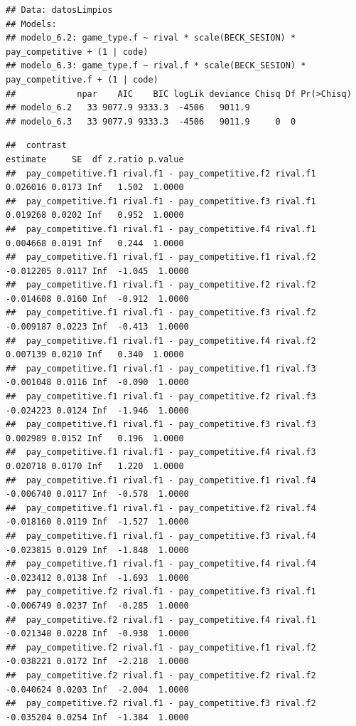 \documentclass[
]{article}
\begin{document}
\begin{verbatim}
## Data: datosLimpios
## Models:
## modelo_6.2: game_type.f ~ rival * scale(BECK_SESION) * pay_competitive + (1 | code)
## modelo_6.3: game_type.f ~ rival.f * scale(BECK_SESION) * pay_competitive.f + (1 | code)
##            npar    AIC    BIC logLik deviance Chisq Df Pr(>Chisq)
## modelo_6.2   33 9077.9 9333.3  -4506   9011.9                    
## modelo_6.3   33 9077.9 9333.3  -4506   9011.9     0  0
\end{verbatim}

\begin{verbatim}
##  contrast                                                   estimate     SE  df z.ratio p.value
##  pay_competitive.f1 rival.f1 - pay_competitive.f2 rival.f1  0.026016 0.0173 Inf   1.502  1.0000
##  pay_competitive.f1 rival.f1 - pay_competitive.f3 rival.f1  0.019268 0.0202 Inf   0.952  1.0000
##  pay_competitive.f1 rival.f1 - pay_competitive.f4 rival.f1  0.004668 0.0191 Inf   0.244  1.0000
##  pay_competitive.f1 rival.f1 - pay_competitive.f1 rival.f2 -0.012205 0.0117 Inf  -1.045  1.0000
##  pay_competitive.f1 rival.f1 - pay_competitive.f2 rival.f2 -0.014608 0.0160 Inf  -0.912  1.0000
##  pay_competitive.f1 rival.f1 - pay_competitive.f3 rival.f2 -0.009187 0.0223 Inf  -0.413  1.0000
##  pay_competitive.f1 rival.f1 - pay_competitive.f4 rival.f2  0.007139 0.0210 Inf   0.340  1.0000
##  pay_competitive.f1 rival.f1 - pay_competitive.f1 rival.f3 -0.001048 0.0116 Inf  -0.090  1.0000
##  pay_competitive.f1 rival.f1 - pay_competitive.f2 rival.f3 -0.024223 0.0124 Inf  -1.946  1.0000
##  pay_competitive.f1 rival.f1 - pay_competitive.f3 rival.f3  0.002989 0.0152 Inf   0.196  1.0000
##  pay_competitive.f1 rival.f1 - pay_competitive.f4 rival.f3  0.020718 0.0170 Inf   1.220  1.0000
##  pay_competitive.f1 rival.f1 - pay_competitive.f1 rival.f4 -0.006740 0.0117 Inf  -0.578  1.0000
##  pay_competitive.f1 rival.f1 - pay_competitive.f2 rival.f4 -0.018160 0.0119 Inf  -1.527  1.0000
##  pay_competitive.f1 rival.f1 - pay_competitive.f3 rival.f4 -0.023815 0.0129 Inf  -1.848  1.0000
##  pay_competitive.f1 rival.f1 - pay_competitive.f4 rival.f4 -0.023412 0.0138 Inf  -1.693  1.0000
##  pay_competitive.f2 rival.f1 - pay_competitive.f3 rival.f1 -0.006749 0.0237 Inf  -0.285  1.0000
##  pay_competitive.f2 rival.f1 - pay_competitive.f4 rival.f1 -0.021348 0.0228 Inf  -0.938  1.0000
##  pay_competitive.f2 rival.f1 - pay_competitive.f1 rival.f2 -0.038221 0.0172 Inf  -2.218  1.0000
##  pay_competitive.f2 rival.f1 - pay_competitive.f2 rival.f2 -0.040624 0.0203 Inf  -2.004  1.0000
##  pay_competitive.f2 rival.f1 - pay_competitive.f3 rival.f2 -0.035204 0.0254 Inf  -1.384  1.0000

\end{verbatim}
\end{document}
